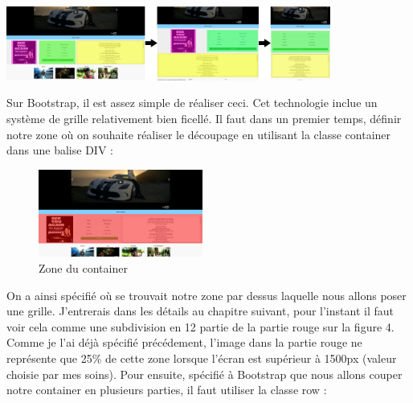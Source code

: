 \documentclass{article}
\begin{document}
\begin{center}
  \includegraphics[width=0.8\textwidth]{p8}
\end{center}

Sur Bootstrap, il est assez simple de r\'ealiser ceci. Cet technologie inclue un syst\`eme de grille relativement bien ficell\'e. Il faut dans un premier temps, d\'efinir notre zone o\`u on souhaite r\'ealiser le d\'ecoupage en utilisant la classe \og container \fg{} dans une balise DIV :
\vspace{0.5cm}\\
\vspace{0.5cm}
\begin{figure}
  \vspace{-20pt}
  \begin{center}
    \includegraphics[width=0.48\textwidth]{p9}
  \end{center}
  \vspace{-20pt}
  \caption{Zone du container}
  \vspace{-10pt}
\end{figure} 
\hspace*{0.6cm}On a ainsi sp\'ecifi\'e o\`u se trouvait notre zone par dessus laquelle nous allons poser une grille. J'entrerais dans les d\'etails au chapitre suivant, pour l'instant il faut voir cela comme une subdivision en 12 partie de la partie rouge sur la figure 4. Comme je l'ai d\'ej\`a sp\'ecifi\'e pr\'ec\'edement, l'image dans la partie rouge ne repr\'esente que 25\% de cette zone lorsque l'\'ecran est sup\'erieur \`a 1500px (valeur choisie par mes soins). Pour ensuite, sp\'ecifi\'e \`a Bootstrap que nous allons couper notre container en plusieurs parties, il faut utiliser la classe \og row \fg{} : 
\vspace{0.5cm}\\
\end{document}
